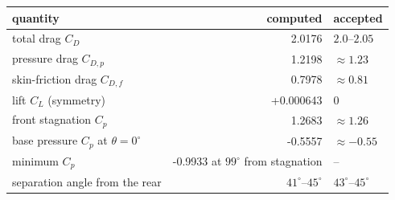 \small
\begin{tabular}{lrl}
\toprule
quantity & computed & accepted\\
\midrule
total drag $C_D$ & 2.0176 & $2.0$--$2.05$\\
pressure drag $C_{D,p}$ & 1.2198 & $\approx1.23$\\
skin-friction drag $C_{D,f}$ & 0.7978 & $\approx0.81$\\
lift $C_L$ (symmetry) & +0.000643 & $0$\\
front stagnation $C_p$ & 1.2683 & $\approx1.26$\\
base pressure $C_p$ at $\theta=0^\circ$ & -0.5557 & $\approx-0.55$\\
minimum $C_p$ & -0.9933 at $99^\circ$ from stagnation & --\\
separation angle from the rear & $41^\circ$--$45^\circ$ & $43^\circ$--$45^\circ$\\
\bottomrule
\end{tabular}
